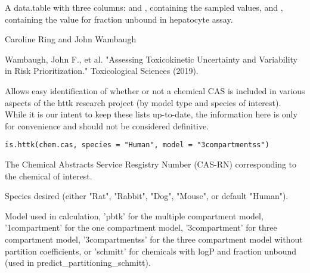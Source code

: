 \documentclass[a4paper]{book}
\begin{document}
%
\begin{Value}
A data.table with three columns:  and
, containing the sampled values, and
, containing the value for fraction unbound in
hepatocyte assay.
\end{Value}
%
\begin{Author}\relax
Caroline Ring and John Wambaugh
\end{Author}
%
\begin{References}\relax
Wambaugh, John F., et al. "Assessing Toxicokinetic Uncertainty and 
Variability in Risk Prioritization." Toxicological Sciences (2019).
\end{References}
%
\begin{Description}\relax
Allows easy identification of whether or not a chemical CAS is included in
various aspects of the httk research project (by model type and species of
interest). While it is our intent to keep these lists up-to-date, the 
information here is only for convenience and should not be considered
definitive.
\end{Description}
%
\begin{Usage}
\begin{verbatim}
is.httk(chem.cas, species = "Human", model = "3compartmentss")
\end{verbatim}
\end{Usage}
%
\begin{Arguments}
\begin{ldescription}
\item[\code{chem.cas}] The Chemical Abstracts Service Resgistry Number (CAS-RN)
corresponding to the chemical of interest.

\item[\code{species}] Species desired (either "Rat", "Rabbit", "Dog", "Mouse", or
default "Human").

\item[\code{model}] Model used in calculation, 'pbtk' for the multiple compartment
model, '1compartment' for the one compartment model, '3compartment' for
three compartment model, '3compartmentss' for the three compartment model
without partition coefficients, or 'schmitt' for chemicals with logP and
fraction unbound (used in predict\_partitioning\_schmitt).
\end{ldescription}
\end{Arguments}
\end{document}
